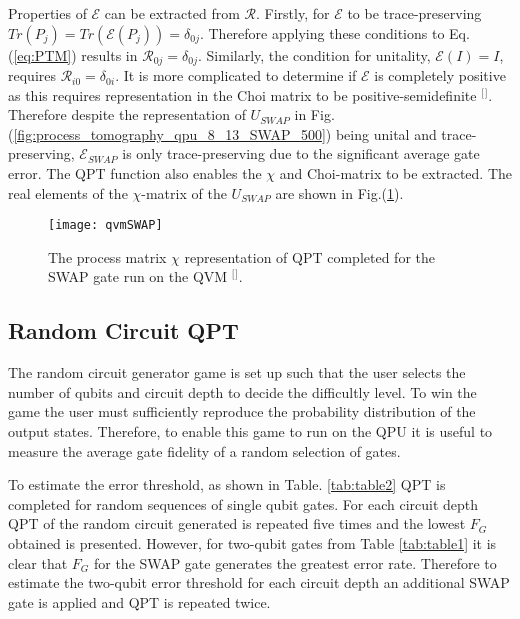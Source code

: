 Properties of $\mathcal{E}$ can be extracted from $\mathcal{R}$. Firstly, for $\mathcal{E}$ to be trace-preserving $Tr(P_{j})=Tr(\mathcal{E} (P_{j}))=\delta_{0j}$. Therefore applying these conditions to Eq.(\ref{eq:PTM}) results in $\mathcal{R}_{0j}=\delta_{0j}$. Similarly, the condition for unitality, $\mathcal{E} (I) = I$, requires $\mathcal{R}_{i0} = \delta_{0i}$. It is more complicated to determine if $\mathcal{E}$ is completely positive as this requires representation in the Choi matrix to be positive-semidefinite $^{[}$\citep{Chow2012UniversalQubits}$^{]}$. Therefore despite the representation of $U_{SWAP}$ in Fig. (\ref{fig:process_tomography_qpu_8_13_SWAP_500}) being unital and trace-preserving, $\mathcal{E}_{SWAP}$ is only trace-preserving due to the significant average gate error. The QPT function also enables the $\chi$ and Choi-matrix to be extracted. The real elements of the $\chi$-matrix of the $U_{SWAP}$ are shown in Fig.(\ref{fig:qvmSWAP}).

\begin{figure}[t]
\centering
\texttt{[image: qvmSWAP]}
\caption{\label{fig:qvmSWAP} The process matrix $\chi$ representation of QPT completed for the SWAP gate run on the QVM $^{[}$\citep{Chow2012UniversalQubits}$^{]}$.}
\end{figure}


\subsection{Random Circuit QPT}
The random circuit generator game is set up such that the user selects the number of qubits and circuit depth to decide the difficultly level. To win the game the user must sufficiently reproduce the probability distribution of the output states. Therefore, to enable this game to run on the QPU it is useful to measure the average gate fidelity of a random selection of gates.

To estimate the error threshold, as shown in Table. \ref{tab:table2} QPT is completed for random sequences of single qubit gates. For each circuit depth QPT of the random circuit generated is repeated five times and the lowest $F_{G}$ obtained is presented. However, for two-qubit gates from Table \ref{tab:table1} it is clear that $F_{G}$ for the SWAP gate generates the greatest error rate. Therefore to estimate the two-qubit error threshold for each circuit depth an additional SWAP gate is applied and QPT is repeated twice.

